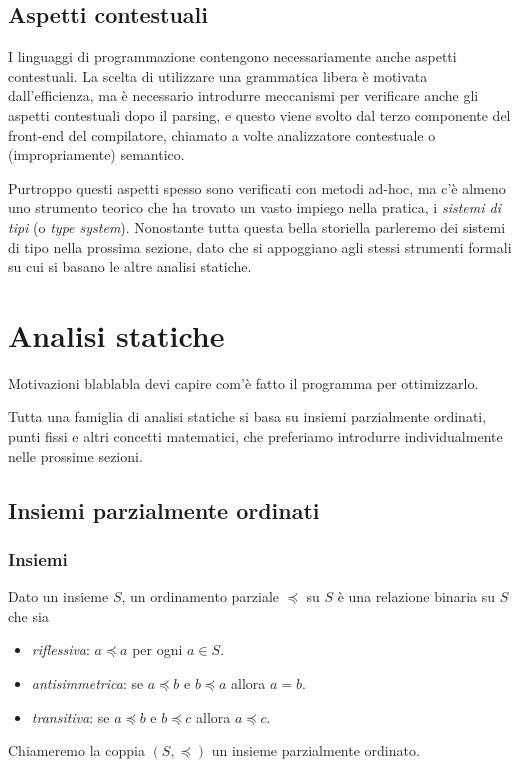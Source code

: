 \documentclass[12pt]{article}
\numberwithin{theorem}{subsection}
\begin{document}
\subsection{Aspetti contestuali}
I linguaggi di programmazione contengono necessariamente anche aspetti contestuali. La scelta di utilizzare una grammatica libera è motivata dall'efficienza, ma è necessario introdurre meccanismi per verificare anche gli aspetti contestuali dopo il parsing, e questo viene svolto dal terzo componente del front-end del compilatore, chiamato a volte analizzatore contestuale o (impropriamente) semantico.

Purtroppo questi aspetti spesso sono verificati con metodi ad-hoc, ma c'è almeno uno strumento teorico che ha trovato un vasto impiego nella pratica, i \textit{sistemi di tipi} (o \textit{type system}). Nonostante tutta questa bella storiella parleremo dei sistemi di tipo nella prossima sezione, dato che si appoggiano agli stessi strumenti formali su cui si basano le altre analisi statiche.

\newpage
\section{Analisi statiche}
Motivazioni blablabla devi capire com'è fatto il programma per ottimizzarlo.

Tutta una famiglia di analisi statiche si basa su insiemi parzialmente ordinati, punti fissi e altri concetti matematici, che preferiamo introdurre individualmente nelle prossime sezioni.

\subsection{Insiemi parzialmente ordinati}
\subsubsection{Insiemi}
\begin{definition}
	Dato un insieme $S$, un ordinamento parziale $\preceq$ su $S$ è una relazione binaria su $S$ che sia \begin{itemize}
		\item \textit{riflessiva}: $a \preceq a$ per ogni $a \in S$.
		\item \textit{antisimmetrica}: se $a \preceq b$ e $b \preceq a$ allora $a = b$.
		\item \textit{transitiva}: se $a \preceq b$ e $b \preceq c$ allora $a \preceq c$.
	\end{itemize}	
	Chiameremo la coppia $(S, \preceq)$ un insieme parzialmente ordinato.
\end{definition}
\end{document}
